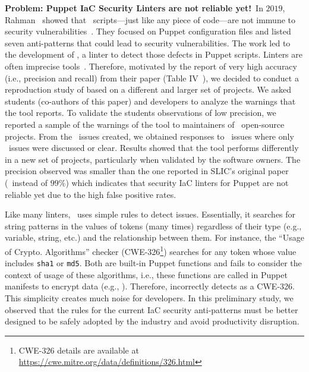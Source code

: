 \vspace{1ex}\noindent\textbf{Problem: Puppet IaC Security Linters are not reliable yet!}~In $2019$, Rahman~\etal{}
showed that \iac\ scripts---just like any piece of code---are not immune to security
vulnerabilities~\cite{8812041,10.1145/3408897}. They focused on Puppet configuration files and listed seven
anti-patterns that could lead to security vulnerabilities. The work led to the development of \slic,
a linter to detect those defects in Puppet scripts. Linters are often
imprecise tools~\cite{6606613,7781843,10.1145/1646353.1646374,8622456,8530713,46576}.
Therefore, motivated by the report of very high accuracy (i.e., precision and recall)
from their paper (Table IV~\cite{8812041}), we
decided to conduct a reproduction study of \slic{} based on a
different and larger set of projects. We asked students (co-authors of
this paper) and developers to analyze the warnings that the tool reports.
To validate the students observations of low precision, we reported a sample of the
warnings of the tool to maintainers of \botTotalRepos\ open-source projects. From
the \botTotalIssues\ issues created, we obtained responses to
\botTotalIssuesAnswers\ issues where only \botFinalIssues\ issues were discussed or clear. 
Results showed that the tool performs differently in a new 
set of projects, particularly when validated by the software owners. 
The precision observed was 
smaller than the one reported in SLIC's original 
paper (\botPrecision\ instead of $99\%$)
which indicates that security IaC linters for Puppet
are not reliable yet due to the high false positive rates.

Like many linters, \slic\ uses simple rules to detect issues.
Essentially, it searches for string patterns in
the values of tokens (many times) regardless of their 
type (e.g., variable, string, etc.)
and the relationship between them. For instance, the
``Usage of Crypto. Algorithms'' checker  
(CWE-326\footnote{CWE-326 details are available at \url{https://cwe.mitre.org/data/definitions/326.html}})
searches for any token whose value includes \texttt{sha1} or \texttt{md5}.
Both are built-in Puppet functions and \slic{} fails to consider
the context of usage of these algorithms, i.e.,
these functions are called in Puppet manifests to
encrypt data (e.g., ).
Therefore, \slic{} incorrectly detects 
 as a CWE-326. 
This simplicity creates much noise for developers. In this preliminary study, 
we observed that the rules for the current IaC security anti-patterns 
must be better designed to be safely adopted by the industry and avoid 
productivity disruption.

